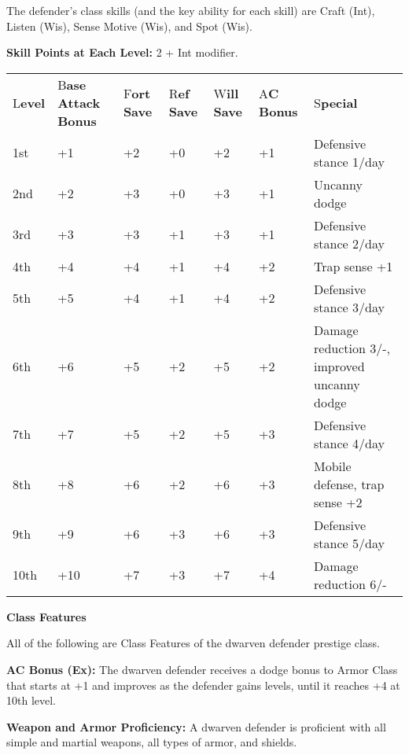 \documentclass{article}
\begin{document}
The defender's class skills (and the key ability for each skill) are Craft (Int), 
Listen (Wis), Sense Motive (Wis), and Spot (Wis). 

\parindent=3pt
\textbf{Skill Points at Each Level:} 2 + Int modifier.

\vspace{12pt}
\parindent=0pt
\begin{tabular}{|>{\raggedright}p{20pt}|>{\raggedright}p{23pt}|>{\raggedright}p{16pt}|>{\raggedright}p{16pt}|>{\raggedright}p{16pt}|>{\raggedright}p{33pt}|>{\raggedright}p{140pt}|}
\hline
\multicolumn{7}{|p{266pt}|}{T\textbf{able: The Dwarven Defender}}\tabularnewline
\hline
L\textbf{evel} & B\textbf{ase}\linebreak{}
\textbf{Attack}\linebreak{}
\textbf{Bonus} & F\textbf{ort}\linebreak{}
\textbf{Save} & R\textbf{ef}\linebreak{}
\textbf{Save} & W\textbf{ill}\linebreak{}
\textbf{Save} & A\textbf{C Bonus} & S\textbf{pecial}\tabularnewline
\hline
1st & +1 & +2 & +0 & +2 & +1 & Defensive stance 1/day\tabularnewline
\hline
2nd & +2 & +3 & +0 & +3 & +1 & Uncanny dodge\tabularnewline
\hline
3rd & +3 & +3 & +1 & +3 & +1 & Defensive stance 2/day\tabularnewline
\hline
4th & +4 & +4 & +1 & +4 & +2 & Trap sense +1\tabularnewline
\hline
5th & +5 & +4 & +1 & +4 & +2 & Defensive stance 3/day\tabularnewline
\hline
6th & +6 & +5 & +2 & +5 & +2 & Damage reduction 3/-, improved uncanny dodge\tabularnewline
\hline
7th & +7 & +5 & +2 & +5 & +3 & Defensive stance 4/day\tabularnewline
\hline
8th & +8 & +6 & +2 & +6 & +3 & Mobile defense, trap sense +2\tabularnewline
\hline
9th & +9 & +6 & +3 & +6 & +3 & Defensive stance 5/day\tabularnewline
\hline
10th & +10 & +7 & +3 & +7 & +4 & Damage reduction 6/-\tabularnewline
\hline
\end{tabular}

\vspace{12pt}
\textbf{Class Features}

All of the following are Class Features of the dwarven defender prestige class.

\textbf{AC Bonus (Ex):} The dwarven defender receives a dodge bonus to Armor Class 
that starts at +1 and improves as the defender gains levels, until it reaches +4 
at 10th level.

\textbf{Weapon and Armor Proficiency:} A dwarven defender is proficient with all 
simple and martial weapons, all types of armor, and shields.
\end{document}

